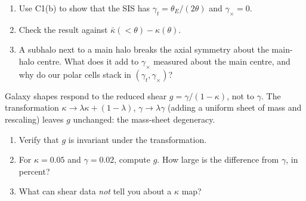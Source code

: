 
\begin{enumerate}
  \item Use C1(b) to show that the SIS has $\gamma_t = \theta_E/(2\theta)$ and $\gamma_\times = 0$.
  \item Check the result against $\bar\kappa(<\theta) - \kappa(\theta)$.
  \item A subhalo next to a main halo breaks the axial symmetry about the main-halo centre. What does it add to
    $\gamma_\times$ measured about the main centre, and why do our polar cells stack in $(\gamma_t, \gamma_\times)$?
\end{enumerate}



\begin{given}
Galaxy shapes respond to the reduced shear $g = \gamma/(1-\kappa)$, not to $\gamma$.
The transformation $\kappa \to \lambda\kappa + (1-\lambda)$, $\gamma \to \lambda\gamma$ (adding a uniform sheet of
mass and rescaling) leaves $g$ unchanged: the mass-sheet degeneracy.
\end{given}


\begin{enumerate}
  \item Verify that $g$ is invariant under the transformation.
  \item For $\kappa = 0.05$ and $\gamma = 0.02$, compute $g$. How large is the difference from $\gamma$, in percent?
  \item What can shear data \emph{not} tell you about a $\kappa$ map?
\end{enumerate}

